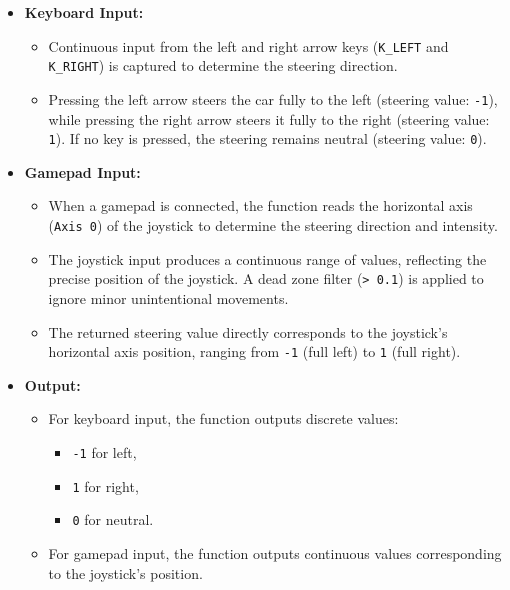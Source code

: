 \documentclass[12pt]{article}
\begin{document}
\begin{itemize}
    \item \textbf{Keyboard Input:}
    \begin{itemize}
        \item Continuous input from the left and right arrow keys (\texttt{K\_LEFT} and \texttt{K\_RIGHT}) is captured to determine the steering direction.
        \item Pressing the left arrow steers the car fully to the left (steering value: \texttt{-1}), while pressing the right arrow steers it fully to the right (steering value: \texttt{1}). If no key is pressed, the steering remains neutral (steering value: \texttt{0}).
    \end{itemize}
    
    \item \textbf{Gamepad Input:}
    \begin{itemize}
        \item When a gamepad is connected, the function reads the horizontal axis (\texttt{Axis 0}) of the joystick to determine the steering direction and intensity.
        \item The joystick input produces a continuous range of values, reflecting the precise position of the joystick. A dead zone filter (\texttt{> 0.1}) is applied to ignore minor unintentional movements.
        \item The returned steering value directly corresponds to the joystick's horizontal axis position, ranging from \texttt{-1} (full left) to \texttt{1} (full right).
    \end{itemize}
    
    \item \textbf{Output:}
    \begin{itemize}
        \item For keyboard input, the function outputs discrete values: 
        \begin{itemize}
            \item \texttt{-1} for left,
            \item \texttt{1} for right,
            \item \texttt{0} for neutral.
        \end{itemize}
        \item For gamepad input, the function outputs continuous values corresponding to the joystick's position.
    \end{itemize}
\end{itemize}
\end{document}
